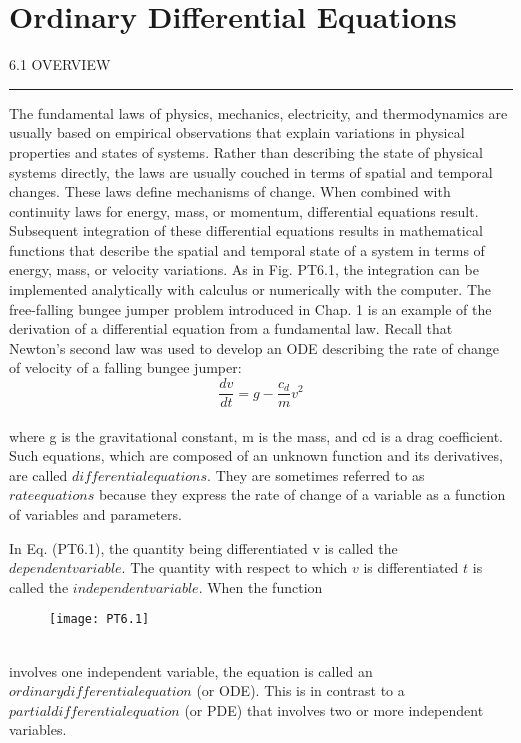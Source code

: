 \documentclass[../main.tex]{subfiles}
\begin{document}
\part{Ordinary Differential
Equations}







\Large{6.1 \; OVERVIEW}\\
\hrule
\vspace{0,5 cm}
The fundamental laws of physics, mechanics, electricity, and thermodynamics are usually
based on empirical observations that explain variations in physical properties and states of
systems. Rather than describing the state of physical systems directly, the laws are usually
couched in terms of spatial and temporal changes. These laws define mechanisms of
change. When combined with continuity laws for energy, mass, or momentum, differential
equations result. Subsequent integration of these differential equations results in mathematical functions that describe the spatial and temporal state of a system in terms of energy,
mass, or velocity variations. As in Fig. PT6.1, the integration can be implemented analytically with calculus or numerically with the computer. The free-falling bungee jumper problem introduced in Chap. 1 is an example of the derivation of a differential equation from a fundamental law. Recall that Newton's second law
was used to develop an ODE describing
the rate of change of velocity of a falling
bungee jumper:
\begin{equation}
\tag{PT6.1}
\dfrac{dv}{dt} = g - \dfrac{c_{d}}{m} v^{2}
\end{equation}\\
where g is the gravitational constant, m is
the mass, and cd is a drag coefficient.
Such equations, which are composed of
an unknown function and its derivatives,
are called $differential equations$. They
are sometimes referred to as $rate equations$ because they express the rate of
change of a variable as a function of variables and parameters.

In Eq. (PT6.1), the quantity being
differentiated v is called the $dependent
variable$. The quantity with respect to
which $v$ is differentiated $t$ is called the
$independent variable$. When the function
\pagebreak
\begin{figure}[hbt!]
	\texttt{[image: PT6.1]}
	\label{PT6.1}
\end{figure}\\
involves one independent variable, the equation is called an $ordinary differential equation$ (or ODE). This is in contrast to a $partial differential equation$ (or PDE) that involves two
or more independent variables.
\end{document}
